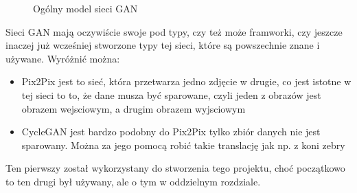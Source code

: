 \documentclass[12pt]{article}
\begin{document}
\begin{sloppypar}
{{\begin{figure}[H]
      \caption{Ogólny model sieci GAN \cite{google-gan}}
      \label{fig:gan-budowa}
    \end{figure}
    Sieci GAN mają oczywiście swoje pod typy, czy też może framworki, czy jeszcze inaczej już wcześniej stworzone typy tej sieci, które są powszechnie znane i używane.
    Wyróżnić można:
    \begin{itemize}
      \item Pix2Pix jest to sieć, która przetwarza jedno zdjęcie w drugie, co jest istotne w tej sieci to to, że dane musza być sparowane, czyli jeden z obrazów jest obrazem wejsciowym, a drugim obrazem wyjsciowym
      \item CycleGAN jest bardzo podobny do Pix2Pix tylko zbiór danych nie jest sparowany. Można za jego pomocą robić takie translację jak np. z koni zebry
    \end{itemize}
    Ten pierwszy został wykorzystany do stworzenia tego projektu, choć początkowo to ten drugi był używany, ale o tym w oddzielnym rozdziale.
  }
}
\end{sloppypar}
\end{document}
